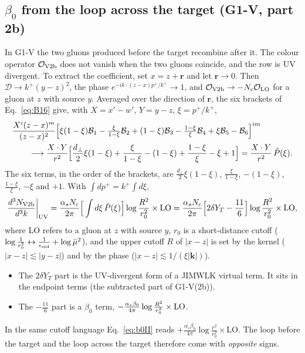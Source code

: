 \documentclass[aps,prd,onecolumn,superscriptaddress,nofootinbib,floatfix,longbibliography,11pt]{revtex4-2}
\numberwithin{equation}{section}
\newcommand{\Phat}{\hat P}
\newcommand{\Ord}{\mathcal{O}}
\begin{document}
\subsection{\texorpdfstring{$\beta_0$}{beta0} from the loop across the target (G1-V, part 2b)}\label{sec:b0V}

In G1-V the two gluons produced before the target recombine after it. The colour operator $\Ord_{\rm V2b}$ does not vanish when the two gluons coincide, and the row is UV divergent. To extract the coefficient, set $x=z+\mathbf r$ and let $\mathbf r\to0$. Then $\mathcal D\to k^+(y-z)^2$, the phase $e^{-ik\cdot(z-x)p^+/k^+}\to1$, and $\Ord_{\rm V2b}\to-N_c\Ord_{\rm LO}$ for a gluon at $z$ with source $y$. Averaged over the direction of $\mathbf r$, the six brackets of Eq.~\eqref{eq:B16} give, with $X=x'-w'$, $Y=y-z$, $\xi=p^+/k^+$,
\begin{align}
&\frac{X^i(z-x)^m}{(z-x)^2}\Big[\xi(1-\xi)\mathcal B_1-\tfrac{\xi}{1-\xi}\mathcal B_2+(1-\xi)\mathcal B_3-\tfrac{1-\xi}{\xi}\mathcal B_4+\xi\mathcal B_5-\mathcal B_6\Big]^{im}\notag\\
&\qquad\longrightarrow\frac{X\cdot Y}{r^2}\Big[\frac{d_\perp}{2}\xi(1-\xi)+\frac{\xi}{1-\xi}-(1-\xi)+\frac{1-\xi}{\xi}-\xi+1\Big]=\frac{X\cdot Y}{r^2}\,\Phat(\xi).
\end{align}
The six terms, in the order of the brackets, are $\frac{d_\perp}{2}\xi(1-\xi)$, $\frac{\xi}{1-\xi}$, $-(1-\xi)$, $\frac{1-\xi}{\xi}$, $-\xi$ and $+1$. With $\int dp^+=k^+\int d\xi$,
\begin{equation}
\frac{d^3N_{\rm V2b}}{d^3k}\bigg|_{\rm UV}=\frac{\alpha_sN_c}{2\pi}\Big[\int d\xi\,\Phat(\xi)\Big]\log\frac{R^2}{r_0^2}\times{\rm LO}=\frac{\alpha_sN_c}{2\pi}\Big[2\delta Y_T-\frac{11}{6}\Big]\log\frac{R^2}{r_0^2}\times{\rm LO},
\label{eq:2bUV}
\end{equation}
where LO refers to a gluon at $z$ with source $y$, $r_0$ is a short-distance cutoff ($\log\frac{1}{r_0^2}\leftrightarrow\frac{1}{\epsilon_{\rm std}}+\log\bar\mu^2$), and the upper cutoff $R$ of $|x-z|$ is set by the kernel ($|x-z|\lesssim|y-z|$) and by the phase ($|x-z|\lesssim1/(\xi|\mathbf k|)$).
\begin{itemize}
\item The $2\delta Y_T$ part is the UV-divergent form of a JIMWLK virtual term. It sits in the endpoint terms (the subtracted part of G1-V(2b)).
\item The $-\frac{11}{6}$ part is a $\beta_0$ term, $-\frac{\alpha_s\beta_0}{4\pi}\log\frac{R^2}{r_0^2}\times{\rm LO}$.
\end{itemize}
In the same cutoff language Eq.~\eqref{eq:b0II} reads $+\frac{\alpha_s\beta_0}{4\pi}\log\frac{r^2}{r_0^2}\times$LO. The loop before the target and the loop across the target therefore come with \emph{opposite} signs.
\end{document}
